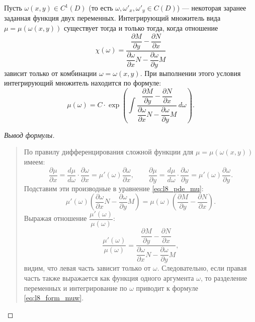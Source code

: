 \begin{proposition}
    Пусть $\omega(x, y) \in C^1(D)$ (то есть $\omega, \omega'_x, \omega'_y \in C(D)$)
    — некоторая заранее заданная функция двух переменных. Интегрирующий
    множитель вида $\mu = \mu(\omega(x, y))$ существует тогда и только тогда,
    когда отношение
    \begin{equation} \label{eq:l8_cond_muw}
        \chi(\omega) = \frac{\dfrac{\partial M}{\partial y} -
        \dfrac{\partial N}{\partial x}}{\dfrac{\partial \omega}{\partial x} N -
        \dfrac{\partial \omega}{\partial y} M} \tag{13}
    \end{equation}
    зависит только от комбинации $\omega = \omega(x, y)$. При выполнении этого
    условия интегрирующий множитель находится по формуле:
    \begin{equation} \label{eq:l8_form_muw}
        \mu(\omega) = C \cdot \exp\left(\int
        \frac{\dfrac{\partial M}{\partial y} -
        \dfrac{\partial N}{\partial x}}{\dfrac{\partial \omega}{\partial x} N -
        \dfrac{\partial \omega}{\partial y} M} \, d\omega\right). \tag{14}
    \end{equation}
\end{proposition}

\begin{proof}[Вывод формулы]~\\
    \begin{quote}
        По правилу дифференцирования сложной функции для
        $\mu = \mu(\omega(x, y))$ имеем:
        \[
            \frac{\partial \mu}{\partial x} =
            \frac{d\mu}{d\omega} \cdot \frac{\partial \omega}{\partial x} =
            \mu'(\omega) \frac{\partial \omega}{\partial x}, \qquad
            \frac{\partial \mu}{\partial y} =
            \frac{d\mu}{d\omega} \cdot \frac{\partial \omega}{\partial y} =
            \mu'(\omega) \frac{\partial \omega}{\partial y}.
        \]
        Подставим эти производные в уравнение \eqref{eq:l8_pde_mu}:
        \[
            \mu'(\omega) \left(\frac{\partial \omega}{\partial x} N -
            \frac{\partial \omega}{\partial y} M\right) =
            \mu(\omega) \left(\frac{\partial M}{\partial y} -
            \frac{\partial N}{\partial x}\right).
        \]
        Выражая отношение $\dfrac{\mu'(\omega)}{\mu(\omega)}$:
        \[
            \frac{\mu'(\omega)}{\mu(\omega)} =
            \frac{\dfrac{\partial M}{\partial y} -
            \dfrac{\partial N}{\partial x}}{\dfrac{\partial \omega}{\partial x} N -
            \dfrac{\partial \omega}{\partial y} M},
        \]
        видим, что левая часть зависит только от $\omega$. Следовательно, если
        правая часть также выражается как функция одного аргумента $\omega$, то
        разделение переменных и интегрирование по $\omega$ приводит к формуле
        \eqref{eq:l8_form_muw}.
    \end{quote}
\end{proof}

